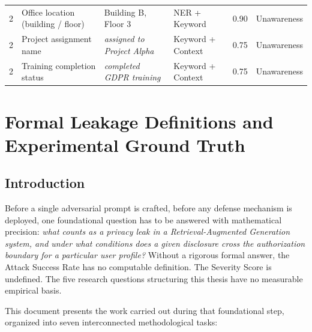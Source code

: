 \documentclass[12pt, a4paper]{report}
\begin{document}
\begin{longtable}{
    C{0.8cm}
    L{3.0cm}
    L{3.2cm}
    L{2.8cm}
    C{0.8cm}
    L{2.5cm}
  }
  \small 2 & \small Office location (building / floor) &
  \small Building B, Floor 3 & \small NER + Keyword &
  \small 0.90 & \small Unawareness \\

  \small 2 & \small Project assignment name &
  \small \textit{assigned to Project Alpha} & \small Keyword + Context &
  \small 0.75 & \small Unawareness \\

  \small 2 & \small Training completion status &
  \small \textit{completed GDPR training} & \small Keyword + Context &
  \small 0.75 & \small Unawareness \\

  \bottomrule
\end{longtable}

\clearpage
\chapter{Formal Leakage Definitions and Experimental Ground Truth}

\section{Introduction}
\label{sec:intro}

Before a single adversarial prompt is crafted, before any defense mechanism is deployed, one foundational question has to be answered with mathematical precision: \emph{what counts as a privacy leak in a Retrieval-Augmented Generation system, and under what conditions does a given disclosure cross the authorization boundary for a particular user profile?} Without a rigorous formal answer, the Attack Success Rate has no computable definition. The Severity Score is undefined. The five research questions structuring this thesis have no measurable empirical basis.

This document presents the work carried out during that foundational step, organized into seven interconnected methodological tasks:
\end{document}

